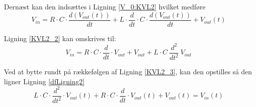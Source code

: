 Dernæst kan den indsættes i Ligning \ref{V_0:KVL2} hvilket medføre 
\begin{equation}
 V_{in}= R \cdot C \cdot \frac{d(V_{out}(t))}{dt} + L\cdot \dfrac{d}{dt} \cdot C\cdot \dfrac{d(V_{out}(t))}{dt} + V_{out}(t)
 \label{KVL2_2}
\end{equation}

Ligning \ref{KVL2_2} kan omskrives til:
\begin{equation}
	V_{in} = R\cdot C\cdot \dfrac{d}{dt}\cdot V_{out}+V_{out}+L\cdot C\ \dfrac{d^{2}}{dt^{2}}\ V_{out}
	\label{KVL2_3}
\end{equation}

\newpage

Ved at bytte rundt på rækkefølgen af Ligning \ref{KVL2_3}, kan den opstilles så den ligner Ligning \ref{dfLigning2}
\begin{equation}
	L\cdot C\cdot \dfrac{d^{2}}{dt^{2}}\cdot V_{out}  \left(t\right) +R\cdot C\cdot \dfrac{d}{dt}\cdot V_{out}  \left(t\right) +V_{out}  \left(t\right)  = V_{in}  \left(t\right)
	\label{KVL2_done} 
\end{equation}


\newpage



\newpage
